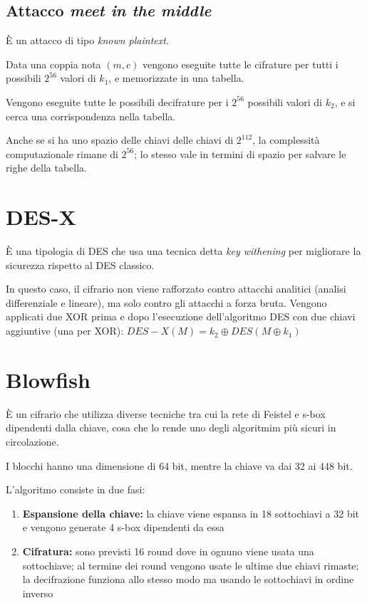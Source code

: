 \subsection{Attacco \textit{meet in the middle}}

È un attacco di tipo \textit{known plaintext}.

\noindent Data una coppia nota $(m, c)$ vengono eseguite tutte le cifrature 
per tutti i possibili $2^{56}$ valori di $k_1$, e memorizzate in una tabella.

\noindent Vengono eseguite tutte le possibili decifrature per i $2^{56}$ possibili 
valori di $k_2$, e si cerca una corrispondenza nella tabella.

\noindent Anche se si ha uno spazio delle chiavi delle chiavi di $2^{112}$, la complessità computazionale 
rimane di $2^{56}$; lo stesso vale in termini di spazio per salvare le righe 
della tabella.

\section{DES-X}


È una tipologia di DES che usa una tecnica detta \textit{key withening} per migliorare la sicurezza rispetto al DES classico. 

\noindent In questo
caso, il cifrario non viene rafforzato contro attacchi analitici (analisi differenziale e lineare), ma solo contro gli attacchi
a forza bruta. Vengono applicati due XOR prima e dopo l’esecuzione dell’algoritmo DES con due chiavi aggiuntive
(una per XOR): $DES-X(M)=k_2 \oplus DES(M \oplus k_1)$ 


\section{Blowfish}

È un cifrario che utilizza diverse tecniche tra cui la rete di Feistel e s-box dipendenti 
dalla chiave, cosa che lo rende uno degli algoritmim più sicuri in circolazione. 

\noindent I blocchi hanno una dimensione di 64 bit, mentre la chiave va dai 32 ai 448 bit.

\noindent L'algoritmo consiste in due fasi:
\begin{enumerate}
    \item \textbf{Espansione della chiave:} la chiave viene espansa in 18 sottochiavi a 32 bit e vengono 
    generate 4 s-box dipendenti da essa 
    \item \textbf{Cifratura:} sono previsti 16 round dove in ognuno viene usata una sottochiave; al termine 
    dei round vengono usate le ultime due chiavi rimaste; la decifrazione funziona allo stesso modo 
    ma usando le sottochiavi in ordine inverso
\end{enumerate}

